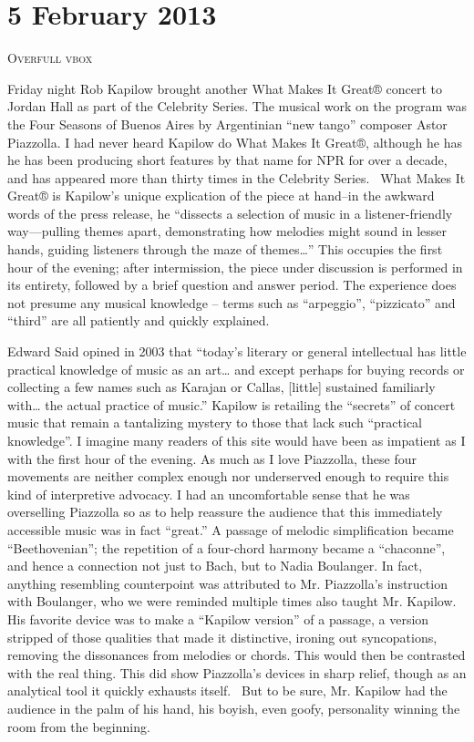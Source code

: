 \chapter{5 February 2013}

\textsc{Overfull vbox}

Friday night Rob Kapilow brought another What Makes It Great® concert to Jordan Hall as part of the Celebrity Series. The musical work on the program was the Four Seasons of Buenos Aires by Argentinian “new tango” composer Astor Piazzolla. I had never heard Kapilow do What Makes It Great®, although he has he has been producing short features by that name for NPR for over a decade, and has appeared more than thirty times in the Celebrity Series.  What Makes It Great® is Kapilow’s unique explication of the piece at hand–in the awkward words of the press release, he “dissects a selection of music in a listener-friendly way—pulling themes apart, demonstrating how melodies might sound in lesser hands, guiding listeners through the maze of themes…” This occupies the first hour of the evening; after intermission, the piece under discussion is performed in its entirety, followed by a brief question and answer period. The experience does not presume any musical knowledge – terms such as “arpeggio”, “pizzicato” and “third” are all patiently and quickly explained.

Edward Said opined in 2003 that “today’s literary or general intellectual has little practical knowledge of music as an art… and except perhaps for buying records or collecting a few names such as Karajan or Callas, [little] sustained familiarly with… the actual practice of music.” Kapilow is retailing the “secrets” of concert music that remain a tantalizing mystery to those that lack such “practical knowledge”. I imagine many readers of this site would have been as impatient as I with the first hour of the evening. As much as I love Piazzolla, these four movements are neither complex enough nor underserved enough to require this kind of interpretive advocacy. I had an uncomfortable sense that he was overselling Piazzolla so as to help reassure the audience that this immediately accessible music was in fact “great.” A passage of melodic simplification became “Beethovenian”; the repetition of a four-chord harmony became a “chaconne”, and hence a connection not just to Bach, but to Nadia Boulanger. In fact, anything resembling counterpoint was attributed to Mr. Piazzolla’s instruction with Boulanger, who we were reminded multiple times also taught Mr. Kapilow. His favorite device was to make a “Kapilow version” of a passage, a version stripped of those qualities that made it distinctive, ironing out syncopations, removing the dissonances from melodies or chords. This would then be contrasted with the real thing. This did show Piazzolla’s devices in sharp relief, though as an analytical tool it quickly exhausts itself.  But to be sure, Mr. Kapilow had the audience in the palm of his hand, his boyish, even goofy, personality winning the room from the beginning.

